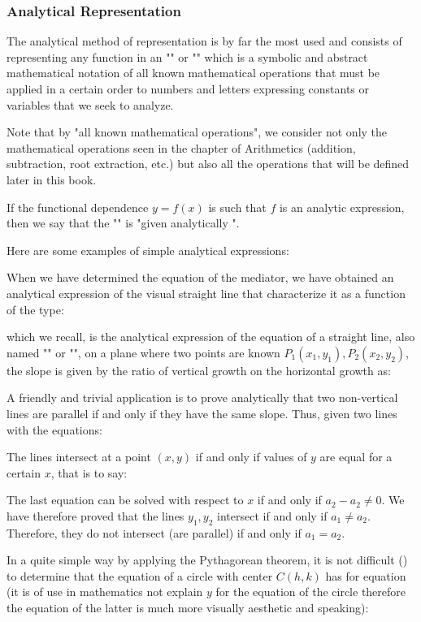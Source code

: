 	\subsubsection{Analytical Representation}
	The analytical method of representation is by far the most used and consists of representing any function in an "" or "" which is a symbolic and abstract mathematical notation of all known mathematical operations that must be applied in a certain order to numbers and letters expressing constants or variables that we seek to analyze.
	
	Note that by "all known mathematical operations", we consider not only the mathematical operations seen in the chapter of Arithmetics (addition, subtraction, root extraction, etc.) but also all the operations that will be defined later in this book.
	
	If the functional dependence $y=f(x)$ is such that $f$ is an analytic expression, then we say that the "" is "given analytically ". 

	Here are some examples of simple analytical expressions:
	
	When we have determined the equation of the mediator, we have obtained an analytical expression of the visual straight line that characterize it as a function of the type:
	
	which we recall, is the analytical expression of the equation of a straight line, also named "" or "", on a plane where two points are known $P_1(x_1,y_1),P_2(x_2,y_2)$, the slope is given by the ratio of vertical growth on the horizontal growth as:
	
	A friendly and trivial application is to prove analytically that two non-vertical lines are parallel if and only if they have the same slope. Thus, given two lines with the equations:
	
	The lines intersect at a point $(x, y)$ if and only if values of $y$ are equal for a certain $x$, that is to say:
	
	The last equation can be solved with respect to $x$ if and only if $a_2-a_2\neq 0$. We have therefore proved that the lines $y_1,y_2$ intersect if and only if $a_1\neq a_2$. Therefore, they do not intersect (are parallel) if and only if $a_1=a_2$.
	
	In a quite simple way by applying the Pythagorean theorem, it is not difficult () to determine that the equation of a circle with center $C (h, k)$ has for equation (it is of use in mathematics not explain $y$ for the equation of the circle therefore the equation of the latter is much more visually aesthetic and speaking):
	
